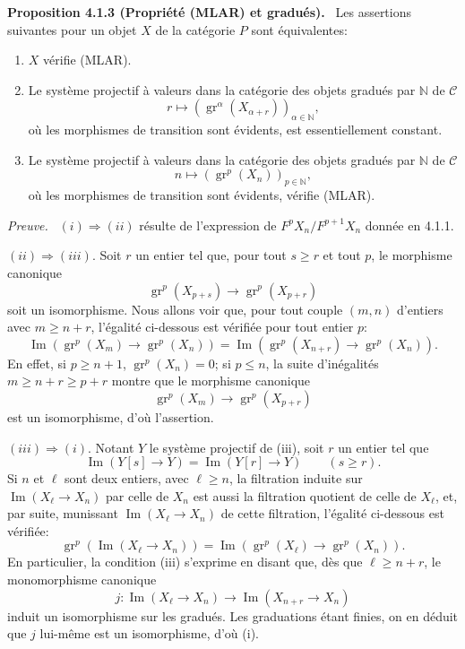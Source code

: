 \documentclass[11pt]{article}
\providecommand{\NN}{\mathbb{N}}
\newenvironment{statement}[1]{\par\medskip\noindent\textbf{#1.}\ }{\par\medskip}
\newenvironment{prooftext}[1][Proof]{\par\noindent\emph{#1.}\ }{\par\medskip}
\providecommand{\gr}{\operatorname{gr}}
\providecommand{\NN}{\mathbb N}
\providecommand{\cC}{\mathcal C}
\providecommand{\Im}{\operatorname{Im}}
\providecommand{\gr}{\operatorname{gr}}
\renewcommand{\Im}{\operatorname{Im}}
\providecommand{\gr}{\operatorname{gr}}
\providecommand{\Im}{\operatorname{Im}}
\providecommand{\cC}{\mathcal C}
\begin{document}
\begin{statement}{Proposition 4.1.3 (Propriété (MLAR) et gradués)}
Les assertions suivantes pour un objet $X$ de la catégorie $P$ sont équivalentes:
\begin{enumerate}[label=(\roman*)]
\item $X$ vérifie (MLAR).
\item Le système projectif à valeurs dans la catégorie des objets gradués par $\NN$ de $\cC$
\[
r\longmapsto (\gr^\alpha(X_{\alpha+r}))_{\alpha\in\NN},
\]
où les morphismes de transition sont évidents, est essentiellement constant.
\item Le système projectif à valeurs dans la catégorie des objets gradués par $\NN$ de $\cC$
\[
n\longmapsto (\gr^p(X_n))_{p\in\NN},
\]
où les morphismes de transition sont évidents, vérifie (MLAR).
\end{enumerate}
\end{statement}

\begin{prooftext}[Preuve]
$(i)\Rightarrow(ii)$ résulte de l'expression de $F^pX_n/F^{p+1}X_n$ donnée en 4.1.1.

$(ii)\Rightarrow(iii)$. Soit $r$ un entier tel que, pour tout $s\ge r$ et tout $p$, le morphisme canonique
\[
\gr^p(X_{p+s})\longrightarrow \gr^p(X_{p+r})
\]
soit un isomorphisme. Nous allons voir que, pour tout couple $(m,n)$ d'entiers avec $m\ge n+r$, l'égalité ci-dessous est vérifiée pour tout entier $p$:
\[
\Im(\gr^p(X_m)\to\gr^p(X_n))=
\Im(\gr^p(X_{n+r})\to\gr^p(X_n)).
\]
En effet, si $p\ge n+1$, $\gr^p(X_n)=0$; si $p\le n$, la suite d'inégalités $m\ge n+r\ge p+r$ montre que le morphisme canonique
\[
\gr^p(X_m)\longrightarrow\gr^p(X_{p+r})
\]
est un isomorphisme, d'où l'assertion.

$(iii)\Rightarrow(i)$. Notant $Y$ le système projectif de (iii), soit $r$ un entier tel que
\[
\Im(Y[s]\to Y)=\Im(Y[r]\to Y)\qquad(s\ge r).
\]
Si $n$ et $\ell$ sont deux entiers, avec $\ell\ge n$, la filtration induite sur $\Im(X_\ell\to X_n)$ par celle de $X_n$ est aussi la filtration quotient de celle de $X_\ell$, et, par suite, munissant $\Im(X_\ell\to X_n)$ de cette filtration, l'égalité ci-dessous est vérifiée:
\[
\gr^p(\Im(X_\ell\to X_n))=
\Im(\gr^p(X_\ell)\to\gr^p(X_n)).
\]
En particulier, la condition (iii) s'exprime en disant que, dès que $\ell\ge n+r$, le monomorphisme canonique
\[
j:\Im(X_\ell\to X_n)\longrightarrow\Im(X_{n+r}\to X_n)
\]
induit un isomorphisme sur les gradués. Les graduations étant finies, on en déduit que $j$ lui-même est un isomorphisme, d'où (i).
\end{prooftext}
\end{document}
